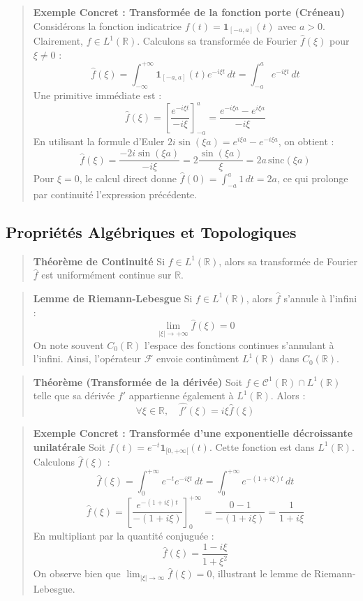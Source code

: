\documentclass[11pt,a4paper]{article}
\begin{document}
\begin{quote}\textbf{Exemple Concret : Transformée de la fonction porte (Créneau)}
Considérons la fonction indicatrice $f(t) = \mathbf{1}_{[-a, a]}(t)$ avec $a > 0$. Clairement, $f \in L^1(\mathbb{R})$.
Calculons sa transformée de Fourier $\hat{f}(\xi)$ pour $\xi \neq 0$ :
$$ \hat{f}(\xi) = \int_{-\infty}^{+\infty} \mathbf{1}_{[-a, a]}(t) e^{-i\xi t} \, dt = \int_{-a}^{a} e^{-i\xi t} \, dt $$
Une primitive immédiate est :
$$ \hat{f}(\xi) = \left[ \frac{e^{-i\xi t}}{-i\xi} \right]_{-a}^{a} = \frac{e^{-i\xi a} - e^{i\xi a}}{-i\xi} $$
En utilisant la formule d'Euler $2i\sin(\xi a) = e^{i\xi a} - e^{-i\xi a}$, on obtient :
$$ \hat{f}(\xi) = \frac{-2i\sin(\xi a)}{-i\xi} = 2 \frac{\sin(\xi a)}{\xi} = 2a \, \text{sinc}(\xi a) $$
Pour $\xi = 0$, le calcul direct donne $\hat{f}(0) = \int_{-a}^a 1 \, dt = 2a$, ce qui prolonge par continuité l'expression précédente.\end{quote}

\subsection{Propriétés Algébriques et Topologiques}

\begin{quote}\textbf{Théorème de Continuité}
Si $f \in L^1(\mathbb{R})$, alors sa transformée de Fourier $\hat{f}$ est uniformément continue sur $\mathbb{R}$.\end{quote}

\begin{quote}\textbf{Lemme de Riemann-Lebesgue}
Si $f \in L^1(\mathbb{R})$, alors $\hat{f}$ s'annule à l'infini :
$$ \lim_{|\xi| \to +\infty} \hat{f}(\xi) = 0 $$
On note souvent $C_0(\mathbb{R})$ l'espace des fonctions continues s'annulant à l'infini. Ainsi, l'opérateur $\mathcal{F}$ envoie continûment $L^1(\mathbb{R})$ dans $C_0(\mathbb{R})$.\end{quote}

\begin{quote}\textbf{Théorème (Transformée de la dérivée)}
Soit $f \in \mathcal{C}^1(\mathbb{R}) \cap L^1(\mathbb{R})$ telle que sa dérivée $f'$ appartienne également à $L^1(\mathbb{R})$. Alors :
$$ \forall \xi \in \mathbb{R}, \quad \widehat{f'}(\xi) = i\xi \hat{f}(\xi) $$\end{quote}

\begin{quote}\textbf{Exemple Concret : Transformée d'une exponentielle décroissante unilatérale}
Soit $f(t) = e^{-t} \mathbf{1}_{[0, +\infty[}(t)$. Cette fonction est dans $L^1(\mathbb{R})$.
Calculons $\hat{f}(\xi)$ :
$$ \hat{f}(\xi) = \int_{0}^{+\infty} e^{-t} e^{-i\xi t} \, dt = \int_{0}^{+\infty} e^{-(1+i\xi)t} \, dt $$
$$ \hat{f}(\xi) = \left[ \frac{e^{-(1+i\xi)t}}{-(1+i\xi)} \right]_0^{+\infty} = \frac{0 - 1}{-(1+i\xi)} = \frac{1}{1+i\xi} $$
En multipliant par la quantité conjuguée :
$$ \hat{f}(\xi) = \frac{1 - i\xi}{1+\xi^2} $$
On observe bien que $\lim_{|\xi| \to \infty} \hat{f}(\xi) = 0$, illustrant le lemme de Riemann-Lebesgue.\end{quote}
\end{document}
